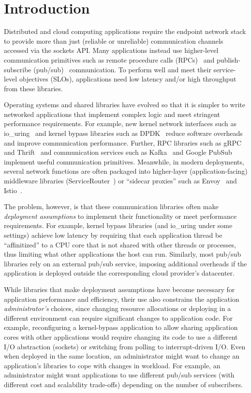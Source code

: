 \section{Introduction}\label{s:intro}
Distributed and cloud computing applications require the endpoint network stack to provide more than just (reliable or unreliable) communication channels accessed via the sockets API.
Many applications 
instead use higher-level communication primitives such as remote procedure calls (RPCs)~\cite{birrell1984implementing} and publish-subscribe (pub/sub)~\cite{virtual-synchrony} communication. 
To perform well and meet their service-level objectives (SLOs), applications need low latency and/or high throughput from these libraries. 

Operating systems and shared libraries have evolved so that it is simpler to write networked applications that implement complex logic and meet stringent performance requirements. For example, new kernel network interfaces such as io\_uring~\cite{iouring} and kernel bypass libraries such as DPDK~\cite{dpdk} reduce software overheads and improve communication performance.
Further, RPC libraries such as gRPC~\cite{grpc} and Thrift~\cite{thrift} and communication services such as Kafka~\cite{kafka} and Google PubSub~\cite{gcp-pubsub} implement useful communication primitives. 
Meanwhile, in modern deployments, several network functions are often packaged into higher-layer (\ie application-facing) middleware libraries (\eg ServiceRouter~\cite{service-router}) or ``sidecar proxies'' such as Envoy~\cite{envoy} and Istio~\cite{istio}.

The problem, however, is that these communication libraries often make {\em deployment assumptions} to implement their functionality or meet performance requirements.
For example, kernel bypass libraries (and io\_uring under some settings) achieve low latency by requiring that each application thread be ``affinitized'' to a CPU core that is not shared with other threads or processes, thus limiting what other applications the host can run.
Similarly, most pub/sub libraries rely on an external pub/sub service, 
imposing additional overheads if the application is deployed outside the corresponding cloud provider's datacenter.

While libraries that make deployment assumptions have become necessary for application performance and efficiency, their use
also constrains the application \emph{administrator's} choices, since changing resource allocations or deploying in a different environment can require significant changes to application code. 
For example, reconfiguring a kernel-bypass application to allow sharing application cores with other applications would require changing its code to use a different I/O abstraction (\eg sockets) or switching from polling to interrupt-driven I/O. 
Even when deployed in the same location, an administrator might want to change an application's libraries to cope with changes in workload.
For example, an administrator might want applications to use different pub/sub services (with different cost and scalability trade-offs) depending on the number of subscribers.

